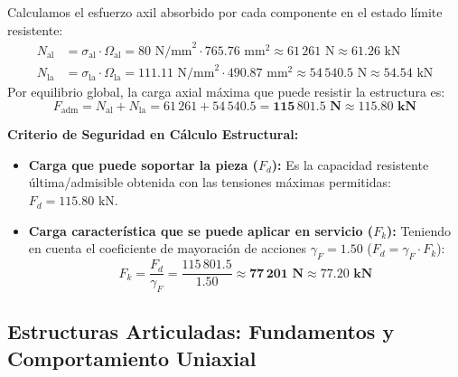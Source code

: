 {    

    Calculamos el esfuerzo axil absorbido por cada componente en el estado límite resistente:
    \begin{align}
        N_{\text{al}} & = \sigma_{\text{al}} \cdot \Omega_{\text{al}} = 80\text{ N/mm}^2 \cdot 765.76\text{ mm}^2 \approx 61\,261\text{ N} \approx 61.26\text{ kN}       \\
        N_{\text{la}} & = \sigma_{\text{la}} \cdot \Omega_{\text{la}} = 111.11\text{ N/mm}^2 \cdot 490.87\text{ mm}^2 \approx 54\,540.5\text{ N} \approx 54.54\text{ kN}
    \end{align}
    Por equilibrio global, la carga axial máxima que puede resistir la estructura es:
    \begin{equation}
        F_{\text{adm}} = N_{\text{al}} + N_{\text{la}} = 61\,261 + 54\,540.5 = \mathbf{115\,801.5\text{ N}} \approx \mathbf{115.80\text{ kN}}
    \end{equation}


    \begin{tcolorbox}[colback=yellow!10, colframe=orange!80!black, arc=3pt, boxrule=0.8pt]
        \textbf{Criterio de Seguridad en Cálculo Estructural:}
        \begin{itemize}
            \item \textbf{Carga que puede soportar la pieza ($F_d$):} Es la capacidad resistente última/admisible obtenida con las tensiones máximas permitidas: $F_d = 115.80\text{ kN}$.
            \item \textbf{Carga característica que se puede aplicar en servicio ($F_k$):} Teniendo en cuenta el coeficiente de mayoración de acciones $\gamma_F = 1.50$ ($F_d = \gamma_F \cdot F_k$):
                  \begin{equation}
                      F_k = \frac{F_d}{\gamma_F} = \frac{115\,801.5}{1.50} \approx \mathbf{77\,201\text{ N}} \approx \mathbf{77.20\text{ kN}}
                  \end{equation}
        \end{itemize}
    \end{tcolorbox}
}

\subsection{Estructuras Articuladas: Fundamentos y Comportamiento Uniaxial}

